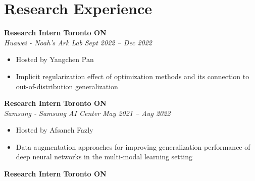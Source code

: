 \section*{Research Experience}
    \vspace{\postsubhead}
      \vspace{\interlist}
      \textbf{Research Intern}
      \hfill
      \textbf{Toronto ON}\\
      \textit{Huawei - Noah's Ark Lab}
      \hfill
      \textit{Sept 2022 -- Dec 2022}
      \begin{itemize}
        \setlength\itemsep{0.2em}
        \item Hosted by Yangchen Pan
        \item Implicit regularization effect of optimization methods and its connection to out-of-distribution generalization
      \end{itemize}
      \textbf{Research Intern}
      \hfill
      \textbf{Toronto ON}\\
      \textit{Samsung - Samsung AI Center}
      \hfill
      \textit{May 2021 -- Aug 2022}
      \begin{itemize}
        \setlength\itemsep{0.2em}
        \item Hosted by Afsaneh Fazly
        \item Data augmentation approaches for improving generalization performance of deep neural networks in the multi-modal learning setting
      \end{itemize}
      \vspace{\interlist}
      \textbf{Research Intern}
      \hfill
      \textbf{Toronto ON}\\
